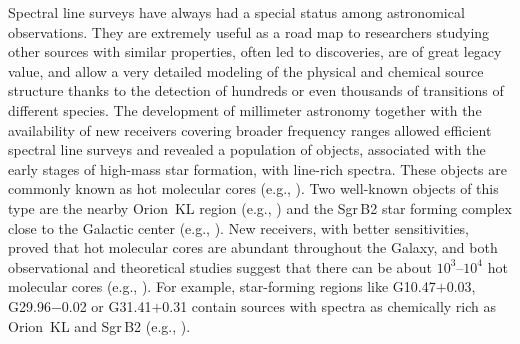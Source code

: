 \documentclass{aa}
\begin{document}
Spectral line surveys have always had a special status among astronomical observations. They are extremely useful as a road map to researchers studying other sources with similar properties, often led to discoveries, are of great legacy value, and allow a very detailed modeling of the physical and chemical source structure thanks to the detection of hundreds or even thousands of transitions of different species. The development of millimeter astronomy together with the availability of new receivers covering broader frequency ranges allowed efficient spectral line surveys and revealed a population of objects, associated with the early stages of high-mass star formation, with line-rich spectra. These objects are commonly known as hot molecular cores (e.g., \citealt{Kurtz2000}). Two well-known objects of this type are the nearby Orion~KL region (e.g., \citealt{Ho1979, Sutton1985, Blake1986, Schilke1997, Schilke2001, Tercero2010, Crockett2014, Gong2015}) and the Sgr\,B2 star forming complex close to the Galactic center (e.g., \citealt{Cummins1986, Turner1989, Nummelin1998, Friedel2004, Belloche2013, Neill2014, Corby2015}). New receivers, with better sensitivities, proved that hot molecular cores are abundant throughout the Galaxy, and both observational and theoretical studies suggest that there can be about $10^3$--$10^4$ hot molecular cores (e.g., \citealt{Wilner2001, Furuya2005, Osorio2009}). For example, star-forming regions like G10.47$+$0.03, G29.96$-$0.02 or G31.41$+$0.31 contain sources with spectra as chemically rich as Orion~KL and Sgr\,B2 (e.g., \citealt{Cesaroni1994, Cesaroni2011, Walmsley1995, Wyrowski1999, Olmi2003, Rolffs2011}).
\end{document}
